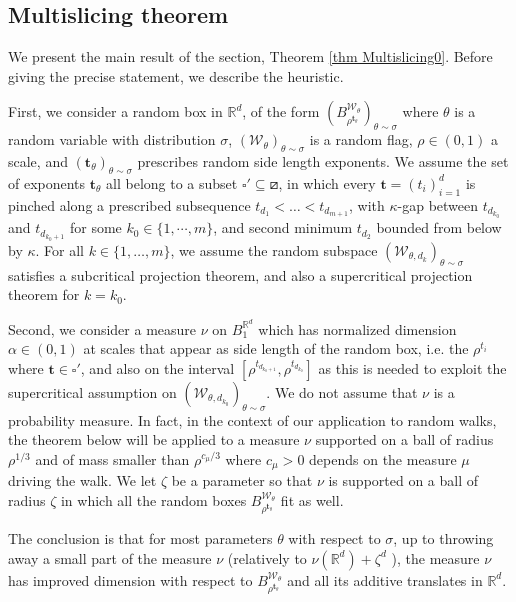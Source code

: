 \documentclass[11pt, leqno, fleqn]{amsart}
\def\cW{\mathcal W}
\def\bt{        \mathbf{t}}
\def \R{{\mathbb R}}
\newcommand{\increasing}{\boxslash}         %
\theoremstyle{definition}
\theoremstyle{definition}
\begin{document}
		 
		\subsection{Multislicing theorem} 
		We present the main result of the section, Theorem \ref{thm Multislicing0}. Before giving the precise statement, we describe the heuristic. 
		 
		 First, we consider a random box in $\R^d$, of the form $ (B^{\cW_{\theta}}_{\rho^{\bt_{\theta} }})_{\theta\sim \sigma}$ where $\theta$ is a random variable with distribution $\sigma$, $(\cW_{\theta})_{\theta\sim \sigma}$ is a random flag, $\rho\in(0, 1)$ a scale, and $(\bt_{\theta})_{\theta\sim \sigma}$ prescribes random side length exponents. We assume the set of exponents $\bt_{\theta}$ all belong to a  subset  $\square'\subseteq \increasing$, in which every $\bt=(t_{i})_{i=1}^d$  is pinched along a prescribed subsequence $t_{d_{1}}<\dots <t_{ d_{m+1}}$,  with $\kappa$-gap between $t_{d_{k_{0}}}$ and $t_{d_{k_{0}+1}}$ for some   $k_{0}\in \{1, \cdots, m\}$, and second minimum $t_{d_{2}}$ bounded from below by $\kappa$. For all $k \in \{1, \dots,m\}$, we assume the random subspace $(\cW_{\theta,d_{k}})_{\theta\sim \sigma}$ satisfies a subcritical projection theorem, and also a supercritical projection theorem for $k=k_{0}$. 
		 
		 Second, we consider a measure $\nu$ on $B^{\R^d}_{1}$ which has normalized dimension $\alpha\in (0, 1)$ at scales that appear as side length of the random box, i.e. the $\rho^{t_{i}}$ where $\bt\in \square'$, and also on the interval $[\rho^{t_{d_{k_{0}+1}}},\rho^{t_{d_{k_{0}}}}]$ as this is needed to exploit the supercritical assumption on $(\cW_{\theta,d_{k_{0}}})_{\theta\sim \sigma}$. We do not assume that $\nu$ is a probability measure. In fact, in the context of our application to random walks, the theorem below  will be applied to a measure $\nu$ supported on a ball of radius $\rho^{1/3}$ and of mass smaller than $\rho^{c_{\mu}/3}$ where $c_{\mu}>0$ depends on the measure $\mu$ driving the  walk. We let $\zeta$ be a parameter so that $\nu$ is supported on a ball of radius $\zeta$ in which all the random boxes $B^{\cW_{\theta}}_{\rho^{\bt_{\theta} }}$ fit as well. 
		 
		 The conclusion is that for most parameters $\theta$ with respect to  $\sigma$, up to throwing away a small part of the measure  $\nu$ (relatively to $\nu(\R^d) + \zeta^d$  ), the measure $\nu$ has improved dimension with respect to $B^{\cW_{\theta}}_{\rho^{\bt_{\theta} }}$ and all its additive translates in $\R^d$.  
		 
\end{document}
